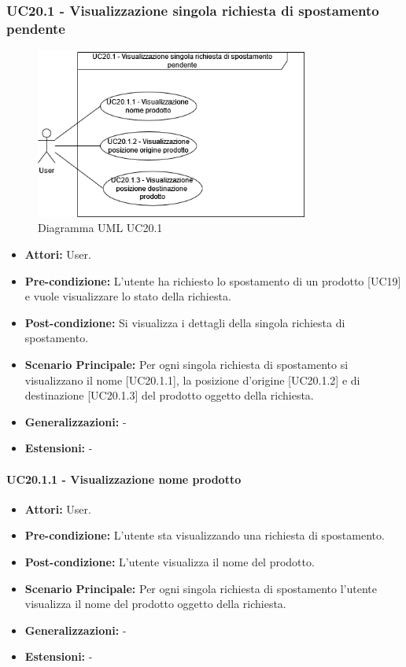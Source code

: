 \subsubsection{UC20.1 - Visualizzazione singola richiesta di spostamento pendente}
\begin{figure}[H]
  \centering
  \includegraphics[width=0.8\textwidth]{UC_diagrams_11-20/UC20.1.drawio.png}
   \caption{Diagramma UML UC20.1}
\end{figure}
\begin{itemize}
    \item \textbf{Attori:} User.
    \item \textbf{Pre-condizione:}  L'utente ha richiesto lo spostamento di un prodotto [UC19] e vuole visualizzare lo stato della richiesta.
    \item \textbf{Post-condizione:} Si visualizza i dettagli della singola richiesta di spostamento.
    \item \textbf{Scenario Principale:} Per ogni singola richiesta di spostamento si visualizzano il nome [UC20.1.1], la posizione d'origine [UC20.1.2] e di destinazione [UC20.1.3] del prodotto oggetto della richiesta.
    \item \textbf{Generalizzazioni:} -
    \item \textbf{Estensioni:} -
\end{itemize}


\paragraph{UC20.1.1 - Visualizzazione nome prodotto}
\begin{itemize}
    \item \textbf{Attori:} User.
    \item \textbf{Pre-condizione:}  L'utente sta visualizzando una richiesta di spostamento.
    \item \textbf{Post-condizione:} L'utente visualizza il nome del prodotto.
    \item \textbf{Scenario Principale:} Per ogni singola richiesta di spostamento l'utente visualizza il nome del prodotto oggetto della richiesta.
    \item \textbf{Generalizzazioni:} -
    \item \textbf{Estensioni:} -
\end{itemize}


